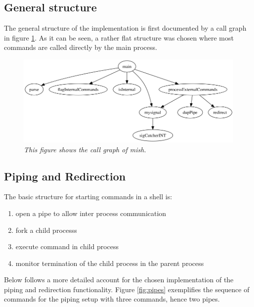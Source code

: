 \documentclass[a4paper,11pt,twoside]{article}
\begin{document}
\subsection{General structure}
The general structure of the implementation is first documented by a call graph in figure \ref{fig:callgraph}. As it can be seen, a rather flat structure was chosen where most commands are called directly by the main process.
\begin{figure}
\centering
\includegraphics[width=\textwidth]{callgraph.png}
\caption{\textit{This figure shows the call graph of mish.}}
\label{fig:callgraph}
\end{figure}


\subsection{Piping and Redirection}

The basic structure for starting commands in a shell is:
\begin{enumerate}
\item open a pipe to allow inter process communication
\item fork a child processs
\item execute command in child process
\item monitor termination of the child process in the parent process
\end{enumerate}

Below follows a more detailed account for the chosen implementation of the piping and redirection functionality. Figure \ref{fig:pipes} exemplifies the sequence of commands for the piping setup with three commands, hence two pipes. 
\end{document}
